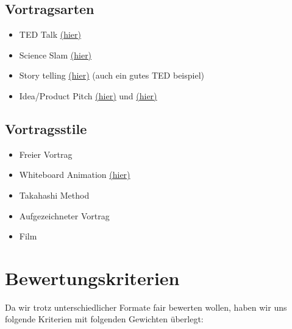 \documentclass[DIV=15,headinclude=true]{scrreprt}
\begin{document}
\begin{multicols}{2}


	\subsection{Vortragsarten}\label{vortragsarten}

	\begin{itemize}
		\item
		      TED Talk
		      \href{https://www.ted.com/talks/chris_anderson_ted_s_secret_to_great_public_speaking}{(hier)}
		\item
		      Science Slam
		      \href{https://www.youtube.com/watch?v=GBVxDy2wx-g}{(hier)}
		\item
		      Story telling
		      \href{https://www.youtube.com/watch?v=D9Ihs241zeg}{(hier)} (auch ein
		      gutes TED beispiel)
		\item
		      Idea/Product Pitch
		      \href{https://www.youtube.com/watch?v=66tEqUX1XKo}{(hier)} und
		      \href{https://www.youtube.com/watch?v=vN4U5FqrOdQ}{(hier)}
	\end{itemize}


	\columnbreak
	\subsection{Vortragsstile}

	\begin{itemize}
		\item
		      Freier Vortrag
		\item
		      Whiteboard Animation
		      \href{https://www.youtube.com/watch?v=i68a6M5FFBc}{(hier)}
		\item
		      Takahashi Method
		\item
		      Aufgezeichneter Vortrag
		\item
		      Film
	\end{itemize}


\end{multicols}

\section{Bewertungskriterien}

Da wir trotz unterschiedlicher Formate fair bewerten wollen, haben wir
uns folgende Kriterien mit folgenden Gewichten überlegt:
\end{document}
